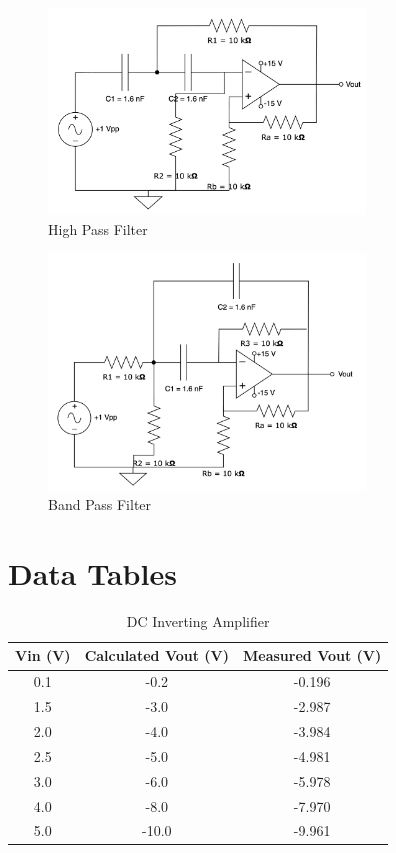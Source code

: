 \documentclass[CMPE]{KGCOEReport}
\begin{document}
\begin{figure}[H]
    \centering
    \includegraphics[width=0.75\textwidth]{7.png}
    \caption{High Pass Filter}
    \label{fig:part7}
\end{figure}

\begin{figure}[H]
    \centering
    \includegraphics[width=0.75\textwidth]{8.png}
    \caption{Band Pass Filter}
    \label{fig:part8}
\end{figure}

\section*{Data Tables}

\begin{table}[H]
    \centering
    \caption{DC Inverting Amplifier}
    \begin{tabular}{|c|c|c|}
        \hline
        Vin (V) & Calculated Vout (V) & Measured Vout (V) \\
        \hline
        0.1 & -0.2 & -0.196 \\
        \hline
        1.5 & -3.0 & -2.987 \\
        \hline
        2.0 & -4.0 & -3.984 \\
        \hline
        2.5 & -5.0 & -4.981 \\
        \hline
        3.0 & -6.0 & -5.978 \\
        \hline
        4.0 & -8.0 & -7.970 \\
        \hline
        5.0 & -10.0 & -9.961 \\
        \hline
    \end{tabular}
\end{table}
\end{document}
